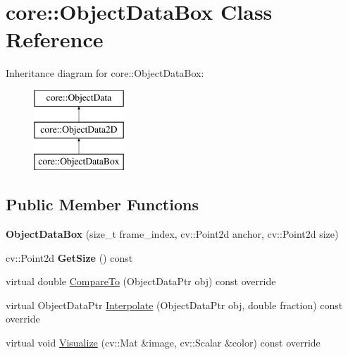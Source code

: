 \hypertarget{classcore_1_1ObjectDataBox}{}\section{core\+:\+:Object\+Data\+Box Class Reference}
\label{classcore_1_1ObjectDataBox}
Inheritance diagram for core\+:\+:Object\+Data\+Box\+:\begin{figure}[H]
\begin{center}
\leavevmode
\includegraphics[height=3.000000cm]{classcore_1_1ObjectDataBox}
\end{center}
\end{figure}
\subsection*{Public Member Functions}
\begin{DoxyCompactItemize}
\item 
{\bfseries Object\+Data\+Box} (size\+\_\+t frame\+\_\+index, cv\+::\+Point2d anchor, cv\+::\+Point2d size)\hypertarget{classcore_1_1ObjectDataBox_a9a1ee3e1e603c1e55adc58a1a58efad2}{}\label{classcore_1_1ObjectDataBox_a9a1ee3e1e603c1e55adc58a1a58efad2}

\item 
cv\+::\+Point2d {\bfseries Get\+Size} () const \hypertarget{classcore_1_1ObjectDataBox_a8134ea14198f45181014d93b27e13b6b}{}\label{classcore_1_1ObjectDataBox_a8134ea14198f45181014d93b27e13b6b}

\item 
virtual double \hyperlink{classcore_1_1ObjectDataBox_a163c57338778f957ce514611c509558a}{Compare\+To} (Object\+Data\+Ptr obj) const override
\item 
virtual Object\+Data\+Ptr \hyperlink{classcore_1_1ObjectDataBox_ab2816bceb771dd7442e6c29193dfe267}{Interpolate} (Object\+Data\+Ptr obj, double fraction) const override
\item 
virtual void \hyperlink{classcore_1_1ObjectDataBox_ab29bacb20c258ba572d0372469ec5523}{Visualize} (cv\+::\+Mat \&image, cv\+::\+Scalar \&color) const override
\end{DoxyCompactItemize}


